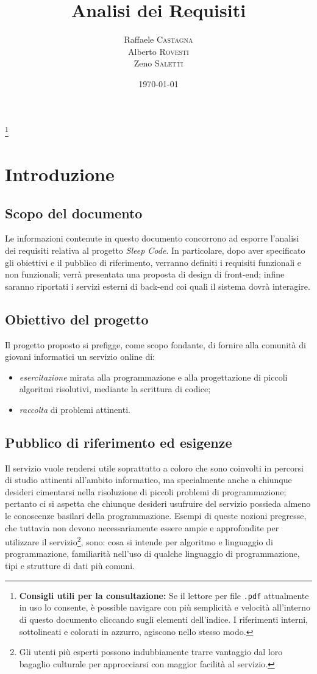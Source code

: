 \documentclass[11pt, a4paper]{article}
\title{Analisi dei Requisiti}
\author{Raffaele \textsc{Castagna}\\
Alberto \textsc{Rovesti}\\
Zeno \textsc{Saletti}}
\date{\today}
\theoremstyle{definition}
\newcommand\blfootnote[1]{%
  \begingroup
  \renewcommand\thefootnote{}\footnote{#1}%
  \addtocounter{footnote}{-1}%
  \endgroup
}
\begin{document}


\tableofcontents\blfootnote{\textbf{Consigli utili per la consultazione:} Se il lettore per file \texttt{.pdf} attualmente in uso lo consente, è possible navigare con più semplicità e velocità all'interno di questo documento cliccando sugli elementi dell'indice. I riferimenti interni, sottolineati e colorati in azzurro, agiscono nello stesso modo.}


\newpage
\section{Introduzione}
\subsection{Scopo del documento}
Le informazioni contenute in questo documento concorrono ad esporre l'analisi
dei requisiti relativa al progetto \textit{Sleep Code}. In particolare, dopo
aver specificato gli obiettivi e il pubblico di riferimento, verranno definiti i requisiti
funzionali e non funzionali; verrà presentata una proposta di design di
front-end; infine saranno riportati i servizi esterni di back-end coi quali il
sistema dovrà interagire.


\subsection{Obiettivo del progetto}
Il progetto proposto si prefigge, come scopo fondante, di fornire alla comunità
di giovani informatici un servizio online di:
\begin{itemize}
    \item \textit{esercitazione} mirata alla programmazione e alla progettazione
    di piccoli algoritmi risolutivi, mediante la scrittura di codice;
    \item \textit{raccolta} di problemi attinenti.
\end{itemize}

\subsection{Pubblico di riferimento ed esigenze}
Il servizio vuole rendersi utile soprattutto a coloro che sono coinvolti
in percorsi di studio attinenti all'ambito informatico, ma specialmente anche
a chiunque desideri cimentarsi nella risoluzione di piccoli problemi di
programmazione; pertanto ci si aspetta che chiunque desideri usufruire del
servizio possieda almeno le conoscenze basilari della programmazione. Esempi
di queste nozioni pregresse, che tuttavia non devono necessariamente essere ampie e approfondite per utilizzare il servizio\footnote{Gli utenti più esperti possono indubbiamente trarre vantaggio dal loro bagaglio culturale per
approcciarsi con maggior facilità al servizio.}, sono: cosa si intende per
algoritmo e linguaggio di programmazione, familiarità nell'uso di qualche
linguaggio di programmazione, tipi e strutture di dati più comuni.
\end{document}
